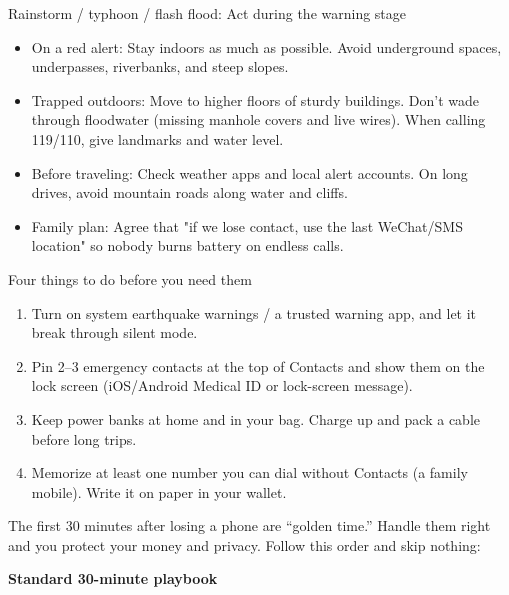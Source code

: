 \begin{tcbwarn}{Rainstorm / typhoon / flash flood: Act during the warning stage}
\begin{itemize}
  \item On a red alert: Stay indoors as much as possible. Avoid underground spaces, underpasses, riverbanks, and steep slopes.
  \item Trapped outdoors: Move to higher floors of sturdy buildings. Don't wade through floodwater (missing manhole covers and live wires). When calling 119/110, give landmarks and water level.
  \item Before traveling: Check weather apps and local alert accounts. On long drives, avoid mountain roads along water and cliffs.
  \item Family plan: Agree that "if we lose contact, use the last WeChat/SMS location" so nobody burns battery on endless calls.
\end{itemize}

\end{tcbwarn}

\begin{tcbpractice}{Four things to do before you need them}
\begin{enumerate}
  \item Turn on system earthquake warnings / a trusted warning app, and let it break through silent mode.
  \item Pin 2–3 emergency contacts at the top of Contacts and show them on the lock screen (iOS/Android Medical ID or lock-screen message).
  \item Keep power banks at home and in your bag. Charge up and pack a cable before long trips.
  \item Memorize at least one number you can dial without Contacts (a family mobile). Write it on paper in your wallet.
\end{enumerate}

\end{tcbpractice}


The first 30 minutes after losing a phone are “golden time.” Handle them right and you protect your money and privacy. Follow this order and skip nothing:

\textbf{Standard 30-minute playbook}\par

